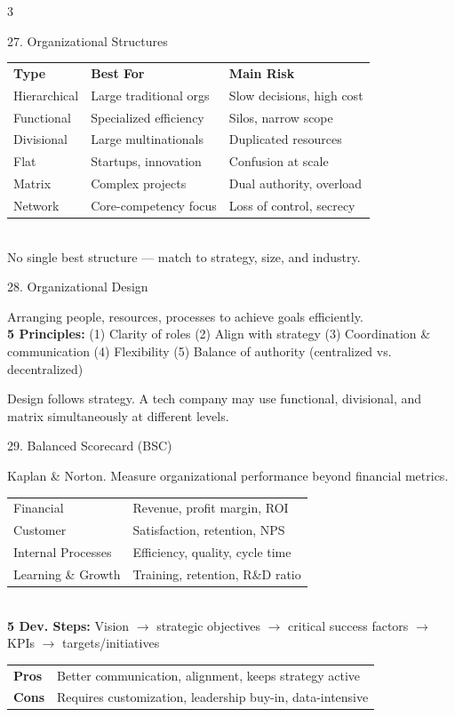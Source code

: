 \documentclass[7.5pt, letterpaper]{article}
\newcommand{\concept}[1]{%
  \vspace{2.5pt}%
  \noindent\colorbox{accent}{\parbox{\dimexpr\linewidth-2\fboxsep}{\fontsize{6.8pt}{7.5pt}\selectfont\bfseries\color{white}\strut #1\strut}}%
  \vspace{1pt}\par%
}
\newcommand{\kv}[2]{\noindent\textbf{#1:} #2\par}
\newcommand{\minitab}[1]{%
  \begingroup
  \fontsize{6.2pt}{7pt}\selectfont
  \setlength{\tabcolsep}{2pt}
  #1
  \endgroup
}
\begin{document}
\begin{multicols}{3}
\concept{27. Organizational Structures}
\minitab{\begin{tabular}{@{}lll@{}}
\textbf{Type} & \textbf{Best For} & \textbf{Main Risk}\\
Hierarchical & Large traditional orgs & Slow decisions, high cost\\
Functional & Specialized efficiency & Silos, narrow scope\\
Divisional & Large multinationals & Duplicated resources\\
Flat & Startups, innovation & Confusion at scale\\
Matrix & Complex projects & Dual authority, overload\\
Network & Core-competency focus & Loss of control, secrecy\\
\end{tabular}}\\
No single best structure --- match to strategy, size, and industry.

\concept{28. Organizational Design}
Arranging people, resources, processes to achieve goals efficiently.\\
\kv{5 Principles}{(1) Clarity of roles (2) Align with strategy (3) Coordination \& communication (4) Flexibility (5) Balance of authority (centralized vs. decentralized)}
Design follows strategy. A tech company may use functional, divisional, and matrix simultaneously at different levels.

\concept{29. Balanced Scorecard (BSC)}
Kaplan \& Norton. Measure organizational performance beyond financial metrics.\\
\minitab{\begin{tabular}{@{}ll@{}}
Financial & Revenue, profit margin, ROI\\
Customer & Satisfaction, retention, NPS\\
Internal Processes & Efficiency, quality, cycle time\\
Learning \& Growth & Training, retention, R\&D ratio\\
\end{tabular}}\\
\kv{5 Dev. Steps}{Vision $\to$ strategic objectives $\to$ critical success factors $\to$ KPIs $\to$ targets/initiatives}
\minitab{\begin{tabular}{@{}ll@{}}
\textbf{Pros} & Better communication, alignment, keeps strategy active\\
\textbf{Cons} & Requires customization, leadership buy-in, data-intensive\\
\end{tabular}}


\end{multicols}
\end{document}
